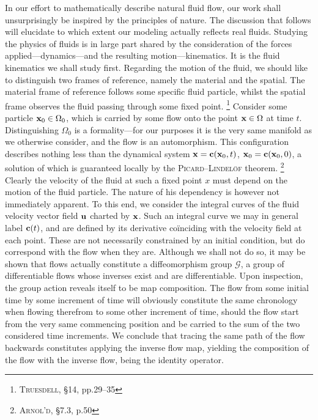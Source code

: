In our effort to mathematically describe natural fluid flow, our work shall unsurprisingly be inspired by the principles of nature.
The discussion that follows will elucidate to which extent our modeling actually reflects real fluids.
Studying the physics of fluids is in large part shared by the consideration of the forces applied---dynamics---and the resulting motion---kinematics.
It is the fluid kinematics we shall study first.
Regarding the motion of the fluid, we should like to distinguish two frames of reference, namely the material and the spatial.
The material frame of reference follows some specific fluid particle, whilst the spatial frame observes the fluid passing through some fixed point.%
\footnote{%
        \cite{truesdell1954kinematics} \textsc{Truesdell}, \S14, pp.29--35
}
Consider some particle $\mathbf{x}_0 \in \Omega_0$, which is carried by some flow onto the point $\mathbf{x} \in \Omega$ at time $t$.
Distinguishing $\Omega_0$ is a formality---for our purposes it is the very same manifold as we otherwise consider, and the flow is an automorphism.
This configuration describes nothing less than the dynamical system $\mathbf{x} = \mathbf{c}(\mathbf{x}_0, t)$, $\mathbf{x}_0 = \mathbf{c}(\mathbf{x}_0, 0)$, a solution of which is guaranteed locally by the \textsc{Picard}--\textsc{Lindelöf} theorem.%
\footnote{%
        \cite{arnold1973ordinary} \textsc{Arnol'd}, \S7.3, p.50
}
Clearly the velocity of the fluid at such a fixed point $x$ must depend on the motion of the fluid particle.
The nature of his dependency is however not immediately apparent.
To this end, we consider the integral curves of the fluid velocity vector field $\mathbf{u}$ charted by $\mathbf{x}$.
Such an integral curve we may in general label $\mathbf{c}(t)$, and are defined by its derivative coïnciding with the velocity field at each point.
These are not necessarily constrained by an initial condition, but do correspond with the flow when they are.
Although we shall not do so, it may be shown that flows actually constitute a diffeomorphism group $\mathscr{G}$, a group of differentiable flows whose inverses exist and are differentiable. Upon inspection, the group action reveals itself to be map composition.
The flow from some initial time by some increment of time will obviously constitute the same chronology when flowing therefrom to some other increment of time, should the flow start from the very same commencing position and be carried to the sum of the two considered time increments.
We conclude that tracing the same path of the flow backwards constitutes applying the inverse flow map, yielding the composition of the flow with the inverse flow, being the identity operator.
